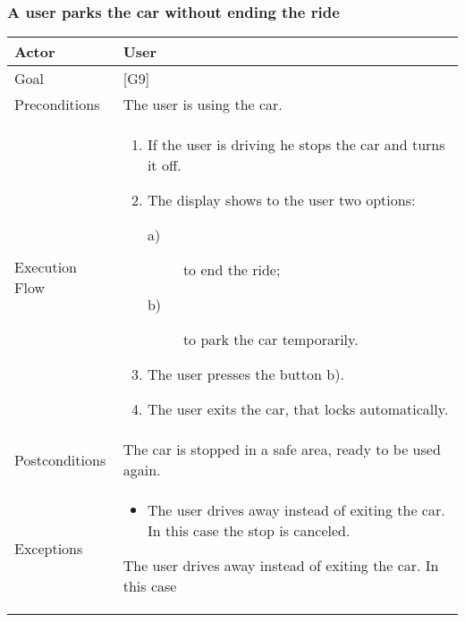 \documentclass{article}
\begin{document}
	\subsubsection{A user parks the car without ending the ride}
	\begin{tabularx}{\textwidth}{  l  X  }
		\hline
		Actor & User\\
		\hline
		Goal & [G9]\\
		\hline
		Preconditions & The user is using the car.\\
		\hline
		Execution Flow & \begin{enumerate}
			\item{If the user is driving he stops the car and turns it off.}
										 \item{The display shows to the user two options:
										 \begin{description} 
										 					\item[a)]{ to end the ride;}
															\item[b)]{ to park the car temporarily.}
						\end{description}}
		 \item{The user presses the button b).}
		 \item{The user exits the car, that locks automatically.}
						\end{enumerate}\\
		\hline
		Postconditions & The car is stopped in a safe area, ready to be used again.\\
		\hline
		Exceptions & \begin{itemize}
			\item{The user drives away instead of exiting the car. In this case the stop is canceled.}
		\end{itemize}The user drives away instead of exiting the car. In this case\\
		\hline
	\end{tabularx}
\end{document}
